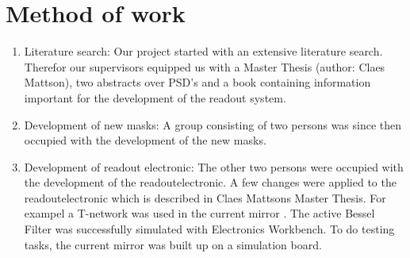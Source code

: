 \chapter{Method of work}

\begin{enumerate}
	\item Literature search: Our project started with an extensive literature search. Therefor our supervisors equipped us with a Master Thesis (author: Claes Mattson), two abstracts over PSD's and a book containing information important for the development of the readout system. 
	\item Development of new masks: A group consisting of two persons was since then occupied with the development of the new masks. 
	\item Development of readout electronic: The other two persons were occupied with the development of the readoutelectronic. A few changes were applied to the readoutelectronic which is described in Claes Mattsons Master Thesis. For exampel a T-network was used in the current mirror . The active Bessel Filter was successfully simulated with Electronics Workbench. To do testing tasks, the current mirror was built up on a simulation board. 

\end{enumerate}
